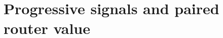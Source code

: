 \documentclass{article}
\newcommand{\cA}{\mathcal{A}}
\newcommand{\cM}{\mathcal{M}}
\newcommand{\J}{\mathcal{J}}
\newcommand{\one}{\mathbf{1}}
\begin{document}



\section{Progressive signals and paired router value}
\label{subsec:paired}
\end{document}

